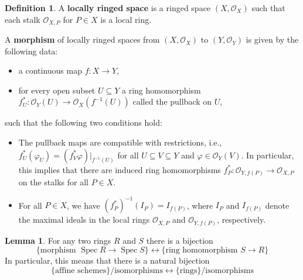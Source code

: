 \documentclass[12pt]{article}
\newlength{\myparskip}
\newenvironment{fullbox}{\begin{lrbox}{\savefullbox}\begin{minipage}{\dimexpr\textwidth-2\fboxsep\relax}\setlength{\parskip}{\myparskip}}{\end{minipage}\end{lrbox}\framebox[\textwidth]{\usebox{\savefullbox}}}
\theoremstyle{definition}
\newtheorem{lem}{Lemma}
\newtheorem{defn}{Definition}
\newenvironment{bprop}{\begin{fullbox}\begin{lem}}{\end{lem}\end{fullbox}}
\newenvironment{bdefn}{\begin{fullbox}\begin{defn}}{\end{defn}\end{fullbox}}
\renewcommand{\phi}{\varphi}
\newcommand{\<}{\langle}
\renewcommand{\>}{\rangle}
\renewcommand{\O}{\mathscr{O}}
\DeclareMathOperator{\Spec}{Spec}
\begin{document}
\begin{bdefn}
    A \textbf{locally ringed space} is a ringed space $(X, \O_X)$ such that each stalk $\O_{X, P}$ for $P \in X$ is a local ring.

    A \textbf{morphism} of locally ringed spaces from $(X, \O_X)$ to $(Y, \O_Y)$ is given by the following data:
    \begin{itemize}
        \item a continuous map $f : X \to Y$,
        \item for every open subset $U \subseteq Y$ a ring homomorphism $f_{U}^* : \O_Y(U) \to \O_{X}(f^{-1}(U))$ called the pullback on $U$,
    \end{itemize}
    such that the following two conditions hold:
    \begin{itemize}
        \item The pullback maps are compatible with restrictions, i.e., $f_U^*(\phi_U) = (f_V^* \phi)|_{f^{-1}(U)}$ for all $U \subseteq V \subseteq Y$ and $\phi \in \O_Y(V)$. In particular, this implies that there are induced ring homomorphisms $f_P^* : \O_{Y, f(P)} \to \O_{X, P}$ on the stalks for all $P \in X$.
        \item For all $P \in X$, we have $(f_P^*)^{-1}(I_P) = I_{f(P)}$, where $I_P$ and $I_{f(P)}$ denote the maximal ideals in the local rings $\O_{X, P}$ and $\O_{Y, f(P)}$, respectively.
    \end{itemize}
\end{bdefn}

\begin{bprop}
    For any two rings $R$ and $S$ there is a bijection
    \[
        \{\text{morphism } \Spec R \to \Spec S\} \longleftrightarrow \{\text{ring homomorphism } S \to R\}
    \]
    In particular, this means that there is a natural bijection
    \[
        \{\text{affine schemes}\}/\text{isomorphisms} \longleftrightarrow \{\text{rings}\}/\text{isomorphisms}
    \]
\end{bprop}
\end{document}
